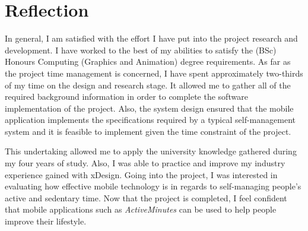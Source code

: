 \section{Reflection}
In general, I am satisfied with the effort I have put into the project research and development. I have worked to the best of my abilities to satisfy the (BSc) Honours Computing (Graphics and Animation) degree requirements. As far as the project time management is concerned, I have spent approximately two-thirds of my time on the design and research stage. It allowed me to gather all of the required background information in order to complete the software implementation of the project. Also, the system design ensured that the mobile application implements the specifications required by a typical self-management system and it is feasible to implement given the time constraint of the project.

This undertaking allowed me to apply the university knowledge gathered during my four years of study. Also, I was able to practice and improve my industry experience gained with xDesign. Going into the project, I was interested in evaluating how effective mobile technology is in regards to self-managing people's active and sedentary time. Now that the project is completed, I feel confident that mobile applications such as \textit{ActiveMinutes} can be used to help people improve their lifestyle.
